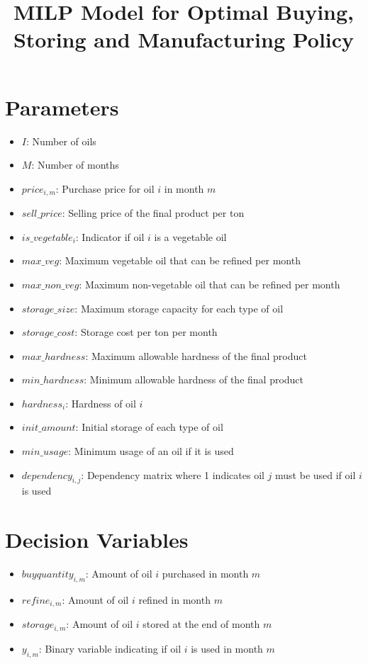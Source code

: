 \documentclass{article}
\begin{document}
\title{MILP Model for Optimal Buying, Storing and Manufacturing Policy}
\author{}
\date{}
\maketitle

\section*{Parameters}
\begin{itemize}
    \item $I$: Number of oils
    \item $M$: Number of months
    \item $price_{i,m}$: Purchase price for oil $i$ in month $m$
    \item $sell\_price$: Selling price of the final product per ton
    \item $is\_vegetable_{i}$: Indicator if oil $i$ is a vegetable oil
    \item $max\_veg$: Maximum vegetable oil that can be refined per month
    \item $max\_non\_veg$: Maximum non-vegetable oil that can be refined per month
    \item $storage\_size$: Maximum storage capacity for each type of oil
    \item $storage\_cost$: Storage cost per ton per month
    \item $max\_hardness$: Maximum allowable hardness of the final product
    \item $min\_hardness$: Minimum allowable hardness of the final product
    \item $hardness_{i}$: Hardness of oil $i$
    \item $init\_amount$: Initial storage of each type of oil
    \item $min\_usage$: Minimum usage of an oil if it is used
    \item $dependency_{i,j}$: Dependency matrix where 1 indicates oil $j$ must be used if oil $i$ is used
\end{itemize}

\section*{Decision Variables}
\begin{itemize}
    \item $buyquantity_{i,m}$: Amount of oil $i$ purchased in month $m$
    \item $refine_{i,m}$: Amount of oil $i$ refined in month $m$
    \item $storage_{i,m}$: Amount of oil $i$ stored at the end of month $m$
    \item $y_{i,m}$: Binary variable indicating if oil $i$ is used in month $m$
\end{itemize}
\end{document}
